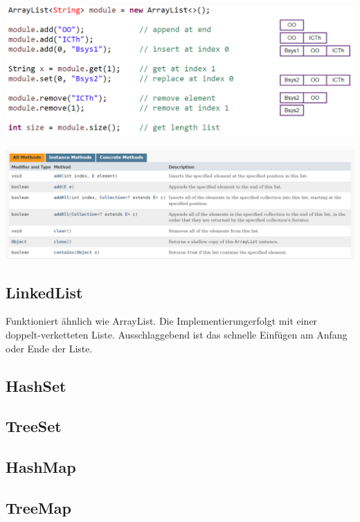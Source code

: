 \begin{center}
    \includegraphics[width=0.9\columnwidth]{pictures/arrayList-bsp.png}
\end{center}

\begin{center}
    \includegraphics[width=0.9\columnwidth]{pictures/arrayList-api.png}
\end{center}

\subsection{LinkedList}
Funktioniert ähnlich wie ArrayList. Die Implementierungerfolgt mit einer doppelt-verketteten Liste.
Ausschlaggebend ist das schnelle Einfügen am Anfang oder Ende der Liste.

\subsection{HashSet}

\subsection{TreeSet}

\subsection{HashMap}

\subsection{TreeMap}

